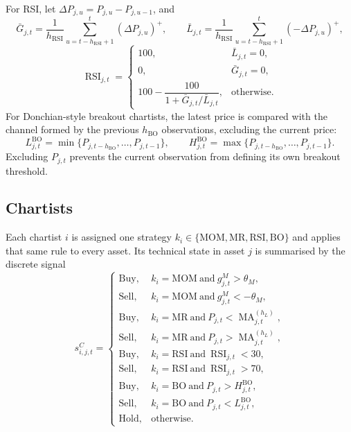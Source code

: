 \documentclass[12pt, a4paper]{article}
\DeclareMathOperator{\MA}{MA}
\DeclareMathOperator{\RSI}{RSI}
\newcommand{\pospart}[1]{\left(#1\right)^{+}}
\begin{document}
    For RSI, let \(\Delta P_{j,u}=P_{j,u}-P_{j,u-1}\), and
    \[
        \bar G_{j,t}=\frac{1}{h_{\mathrm{RSI}}}\sum_{u=t-h_{\mathrm{RSI}}+1}^{t}\pospart{\Delta P_{j,u}},
        \qquad
        \bar L_{j,t}=\frac{1}{h_{\mathrm{RSI}}}\sum_{u=t-h_{\mathrm{RSI}}+1}^{t}\pospart{-\Delta P_{j,u}},
    \]
    \[
        \RSI_{j,t}=
        \begin{cases}
            100, & \bar L_{j,t}=0,\\
            0, & \bar G_{j,t}=0,\\
            100-\dfrac{100}{1+\bar G_{j,t}/\bar L_{j,t}}, & \text{otherwise}.
        \end{cases}
    \]
    For Donchian-style breakout chartists, the latest price is compared with the
    channel formed by the previous \(h_{\mathrm{BO}}\) observations, excluding the
    current price:
    \[
        L_{j,t}^{\mathrm{BO}}=\min\{P_{j,t-h_{\mathrm{BO}}},\ldots,P_{j,t-1}\},
        \qquad
        H_{j,t}^{\mathrm{BO}}=\max\{P_{j,t-h_{\mathrm{BO}}},\ldots,P_{j,t-1}\}.
    \]
    Excluding \(P_{j,t}\) prevents the current observation from defining its own
    breakout threshold.

    \subsection{Chartists}
    Each chartist \(i\) is assigned one strategy
    \(k_i\in\{\mathrm{MOM},\mathrm{MR},\mathrm{RSI},\mathrm{BO}\}\) and applies that
    same rule to every asset. Its technical state in asset \(j\) is
    summarised by the discrete signal
    \[
        s_{i,j,t}^{C}=
        \begin{cases}
            \mathrm{Buy}, & k_i=\mathrm{MOM}\ \text{and}\ g_{j,t}^M>\theta_M,\\
            \mathrm{Sell}, & k_i=\mathrm{MOM}\ \text{and}\ g_{j,t}^M<-\theta_M,\\
            \mathrm{Buy}, & k_i=\mathrm{MR}\ \text{and}\ P_{j,t}<\MA_{j,t}^{(h_L)},\\
            \mathrm{Sell}, & k_i=\mathrm{MR}\ \text{and}\ P_{j,t}>\MA_{j,t}^{(h_L)},\\
            \mathrm{Buy}, & k_i=\mathrm{RSI}\ \text{and}\ \RSI_{j,t}<30,\\
            \mathrm{Sell}, & k_i=\mathrm{RSI}\ \text{and}\ \RSI_{j,t}>70,\\
            \mathrm{Buy}, & k_i=\mathrm{BO}\ \text{and}\ P_{j,t}>H_{j,t}^{\mathrm{BO}},\\
            \mathrm{Sell}, & k_i=\mathrm{BO}\ \text{and}\ P_{j,t}<L_{j,t}^{\mathrm{BO}},\\
            \mathrm{Hold}, & \text{otherwise}.
        \end{cases}
    \]
\end{document}
